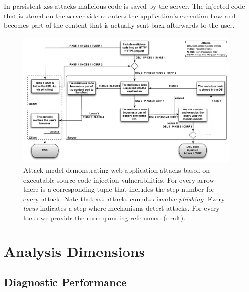 \documentclass[conference]{IEEEtran}
\begin{document}
In persistent {\sc xss} attacks malicious code is saved by the server.
The injected code that is stored on the server-side re-enters the
application's execution flow and becomes part of the content that is
actually sent back afterwards to the user.

\begin{figure}
\begin{center}
\leavevmode
\includegraphics[scale=0.61]{attacks-steps.pdf}
\end{center}
\caption{\label{fig:attacks}Attack model demonstrating web
application attacks based on executable source
code injection vulnerabilities. For every arrow there is a
corresponding tuple that includes the step number for
every attack. Note that {\sc xss} attacks can also involve
{\it phishing}. Every {\it locus} indicates a step where mechanisms
detect attacks. For every locus we provide the corresponding
references: ({\sc draft}).}
\end{figure}

\section{Analysis Dimensions}
\label{sec:dimensions}

\subsection{Diagnostic Performance}
\end{document}
